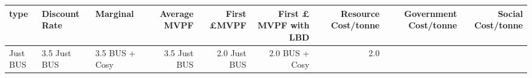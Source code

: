 
\begin{tabular}{lllrrrrrr}
\toprule
type & Discount Rate & %
Marginal & Average MVPF & First £MVPF & First £ MVPF
 with LBD & Resource Cost/tonne & Government Cost/tonne & Social Cost/tonne\\
\midrule
Just BUS & 3.5%
Just BUS & 3.5%
BUS + Cosy & 3.5%
\midrule
Just BUS & 2.0%
Just BUS & 2.0%
\addlinespace
BUS + Cosy & 2.0%
\bottomrule
\end{tabular}

